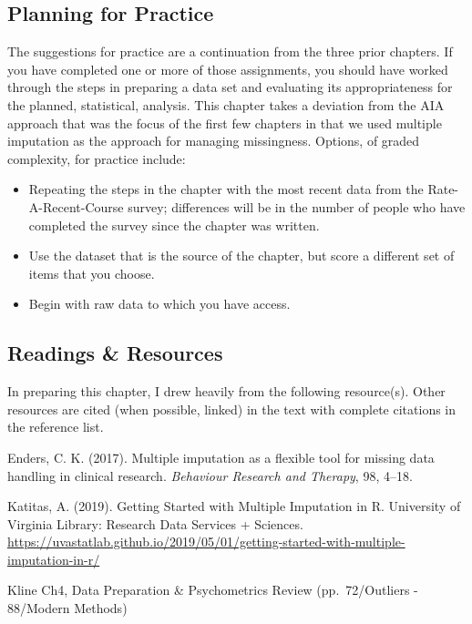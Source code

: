 \documentclass[
  11pt,
]{book}
\providecommand{\tightlist}{%
  \setlength{\itemsep}{0pt}\setlength{\parskip}{0pt}}
\begin{document}
\hypertarget{planning-for-practice-3}{%
\subsection{Planning for Practice}\label{planning-for-practice-3}}

The suggestions for practice are a continuation from the three prior chapters. If you have completed one or more of those assignments, you should have worked through the steps in preparing a data set and evaluating its appropriateness for the planned, statistical, analysis. This chapter takes a deviation from the AIA \citep{parent_handling_2013} approach that was the focus of the first few chapters in that we used multiple imputation as the approach for managing missingness. Options, of graded complexity, for practice include:

\begin{itemize}
\tightlist
\item
  Repeating the steps in the chapter with the most recent data from the Rate-A-Recent-Course survey; differences will be in the number of people who have completed the survey since the chapter was written.
\item
  Use the dataset that is the source of the chapter, but score a different set of items that you choose.
\item
  Begin with raw data to which you have access.
\end{itemize}

\hypertarget{readings-resources-3}{%
\subsection{Readings \& Resources}\label{readings-resources-3}}

In preparing this chapter, I drew heavily from the following resource(s). Other resources are cited (when possible, linked) in the text with complete citations in the reference list.

Enders, C. K. (2017). Multiple imputation as a flexible tool for missing data handling in clinical research. \emph{Behaviour Research and Therapy}, 98, 4--18.

Katitas, A. (2019). Getting Started with Multiple Imputation in R. University of Virginia Library: Research Data Services + Sciences. \url{https://uvastatlab.github.io/2019/05/01/getting-started-with-multiple-imputation-in-r/}

Kline Ch4, Data Preparation \& Psychometrics Review (pp.~72/Outliers - 88/Modern Methods)
\end{document}
